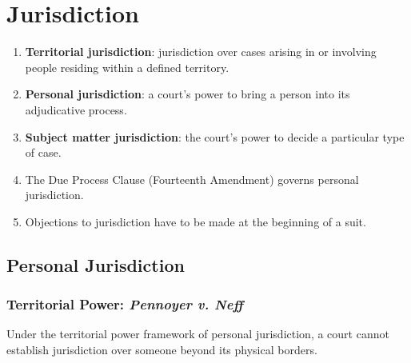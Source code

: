 \section{Jurisdiction}

\begin{enumerate}
    \item \textbf{Territorial jurisdiction}: jurisdiction over cases arising in or 
    involving people residing within a defined territory.
    \item \textbf{Personal jurisdiction}: a court's power to bring a person into its 
    adjudicative process.
    \item \textbf{Subject matter jurisdiction}: the court's power to decide a 
    particular type of case.
    \item The Due Process Clause (Fourteenth Amendment) governs personal 
    jurisdiction.
    \item Objections to jurisdiction have to be made at the beginning of a suit.
\end{enumerate}

\subsection{Personal Jurisdiction}

\subsubsection{Territorial Power: \emph{Pennoyer v. Neff}}

Under the territorial power framework of personal jurisdiction, a court cannot 
establish jurisdiction over someone beyond its physical borders.

